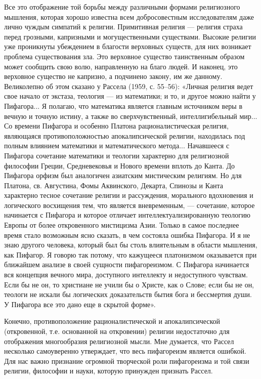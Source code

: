 Все это  отображение той борьбы между  различными формами религиозного
мышления, которая  хорошо известна всем  добросовестным исследователям
даже лично чуждым симпатий к  религии. Примитивная религия --- религия
страха  перед  грозными,   капризными  и  могущественными  существами.
Высокие  религии  уже  проникнуты   убеждением  в  благости  верховных
существ, для  них возникает проблема существования  зла. Это верховное
существо таинственным  образом может сообщить свою  волю, направленную
на  благо людей.  И наконец,  это  верховное существо  не капризно,  а
подчинено закону, им же данному. Великолепно об этом сказано у Рассела
(1959,  с. 55--56):  «Личная  религия ведет  свое  начало от  экстаза,
теология --- из математики; и то, и другое можно найти у Пифагора... Я
полагаю,  что математика  является  главным источником  веры в  вечную
и  точную  истину,  а   также  во  сверхчувственный,  интеллигибельный
мир...  Со  времени  Пифагора и  особенно  Платона  рационалистическая
религия,   являющаяся  противоположностью   апокалипсической  религии,
находилась под полным влиянием  математики и математического метода...
Начавшееся с  Пифагора сочетание математики и  теологии характерно для
религиозной философии  Греции, Средневековья  и Нового  времени вплоть
до  Канта. До  Пифагора  орфизм был  аналогичен азиатским  мистическим
религиям.  Но для  Платона, св.  Августина, Фомы  Аквинского, Декарта,
Спинозы  и Канта  характерно тесное  сочетание религии  и рассуждения,
морального  вдохновения и  логического  восхищения  тем, что  является
вневременным, ---  сочетание, которое начинается с  Пифагора и которое
отличает интеллектуализированную теологию Европы от более откровенного
мистицизма Азии. Только  в самое последнее время  стало возможным ясно
сказать, в чем состояла ошибка Пифагора. И я не знаю другого человека,
который был  бы столь влиятельным  в области мышления, как  Пифагор. Я
говорю так потому, что кажущееся платонизмом оказывается при ближайшем
анализе  в своей  сущности  пифагореизмом. С  Пифагора начинается  вся
концепция вечного мира, доступного интеллекту и недоступного чувствам.
Если бы не он, то христиане не учили бы о Христе, как о Слове; если бы
не  он, теологи  не искали  бы логических  доказательств бытия  бога и
бессмертия души. У Пифагора все это дано еще в скрытой форме».

Конечно,   противоположение   рационалистической  и   апокалипсической
(откровенной, т.е. основанной на  откровении) религии недостаточно для
отображения многообразия  религиозной мысли. Мне думается,  что Рассел
несколько  самоуверенно  утверждает,  что  весь  пифагореизм  является
ошибкой. Для нас важно признание огромной творческой роли пифагореизма
и той  связи религии,  философии и  науки, которую  принужден признать
Рассел.

